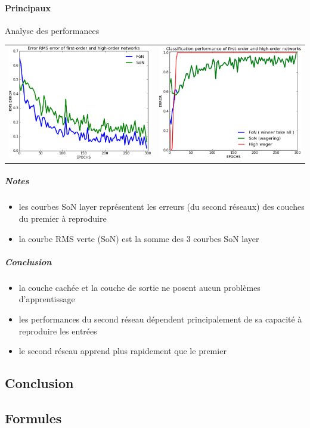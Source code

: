     \paragraph{Principaux}
      Analyse des performances
      \begin{center}
	\begin{tabular}{lr}
	  \hspace*{-1cm}
	  \includegraphics[width=250px]{data/expC4/rms.png}
	  &
	  \includegraphics[width=250px]{data/expC4/perf.png} 
	\end{tabular}
      \end{center}
      \subparagraph{Notes}
	\begin{itemize}
	  \item les courbes SoN layer représentent les erreurs (du second réseaux) des couches du premier à reproduire 
	  \item la courbe RMS verte (SoN) est la somme des 3 courbes SoN layer
	\end{itemize}
      \subparagraph{Conclusion}
	\begin{itemize}
	  \item la couche cachée et la couche de sortie ne posent aucun problèmes d'apprentissage
	  \item les performances du second réseau dépendent principalement de sa capacité à reproduire les entrées
	  \item le second réseau apprend plus rapidement que le premier
	\end{itemize}

  \subsection{Conclusion}
  
  

  \newpage 
  \subsection{Formules}
    
    
    
    


